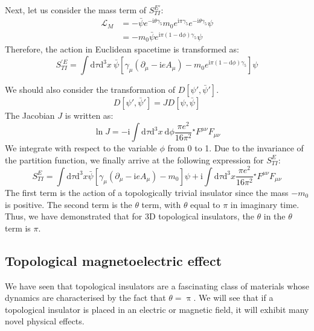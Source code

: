 Next, let us consider the mass term of $S_{TI}^{E'}$:
\begin{equation}
\begin{aligned}
\mathcal{L}_M &= -\bar{\psi} e^{-\mathrm{i}\theta \gamma_5} m_0 e^{\mathrm{i}\pi \gamma_5} e^{-\mathrm{i}\theta \gamma_5} \psi \\
&= -m_0 \bar{\psi} e^{\mathrm{i}\pi(1 - \mathrm{d}\phi)\gamma_5} \psi
\end{aligned}
\end{equation}
Therefore, the action in Euclidean spacetime is transformed as:
\begin{equation}
S_{TI}^{'E} = \int \mathrm{d}\tau \mathrm{d}^3x \ \bar{\psi} [\gamma_\mu(\partial_\mu - \mathrm{i}eA_\mu) - m_0 e^{\mathrm{i}\pi(1-\mathrm{d}\phi)\gamma_5}] \psi
\end{equation}

We should also consider the transformation of $D[\psi', \bar{\psi}']$.
\begin{equation}
D[\psi', \bar{\psi}'] = J D[\psi, \bar{\psi}]
\end{equation}
The Jacobian $J$ is written as:
\begin{equation}
\ln J = -\mathrm{i} \int \mathrm{d}\tau \mathrm{d}^3x \ \mathrm{d}\phi \frac{\pi e^2}{16 \pi^2} {}^\star F^{\mu\nu} F_{\mu\nu}
\end{equation}
We integrate with respect to the variable $\phi$ from 0 to 1. Due to the invariance of the partition function, we finally arrive at the following expression for $S_{TI}^E$:
\begin{equation}
S_{TI}^E = \int \mathrm{d}\tau \mathrm{d}^3x \bar{\psi} [\gamma_\mu (\partial_\mu - \mathrm{i}eA_\mu) - m_0] \psi + \mathrm{i} \int \mathrm{d}\tau \mathrm{d}^3x \frac{\pi e^2}{16 \pi^2} {}^\star F^{\mu\nu} F_{\mu\nu}
\end{equation}
The first term is the action of a topologically trivial insulator since the mass $-m_0$ is positive. The second term is the $\theta$ term, with $\theta$ equal to $\pi$ in imaginary time.
Thus, we have demonstrated that for 3D topological insulators, the $\theta$ in the $\theta$ term is $\pi$.

\subsection{Topological magnetoelectric effect}

We have seen that topological insulators are a fascinating class of materials whose dynamics are characterised by the fact that $\theta = \uppi$.
We will see that if a topological insulator is placed in an electric or magnetic field, it will exhibit many novel physical effects.

